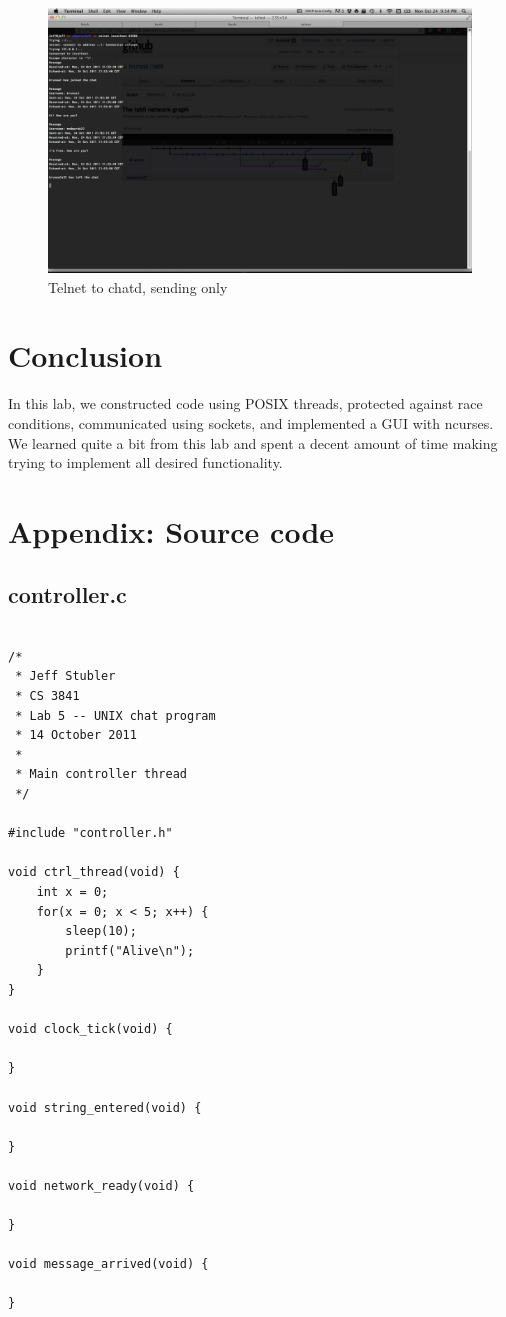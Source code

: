 \documentclass{article}
\begin{document}
\begin{figure}[!h]
\begin{center}
\includegraphics[scale=0.2]{receive.png}
\end{center}
\caption{Telnet to chatd, sending only}
\label{chatd-receive}
\end{figure}

\section*{Conclusion}
In this lab, we constructed code using POSIX threads, protected against race conditions, communicated using sockets, and implemented a GUI with ncurses. We learned quite a bit from this lab and spent a decent amount of time making trying to implement all desired functionality.

\section*{Appendix: Source code}

\subsection*{controller.c}

\begin{verbatim}

/*
 * Jeff Stubler
 * CS 3841
 * Lab 5 -- UNIX chat program
 * 14 October 2011
 *
 * Main controller thread
 */

#include "controller.h"

void ctrl_thread(void) {
    int x = 0;
    for(x = 0; x < 5; x++) {
        sleep(10);
        printf("Alive\n");
    }
}

void clock_tick(void) {
    
}

void string_entered(void) {
    
}

void network_ready(void) {
    
}

void message_arrived(void) {
    
}

\end{verbatim}
\end{document}
